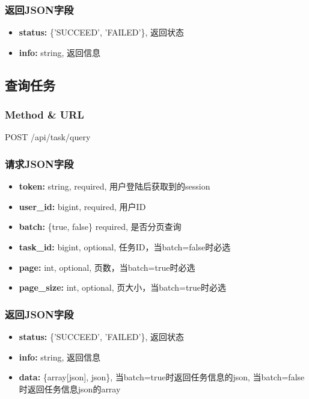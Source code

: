 ﻿\documentclass[a4paper]{report}
\begin{document}
\subsubsection{返回JSON字段}
\begin{itemize}
	\item \textbf{status:} \{'SUCCEED', 'FAILED'\}, 返回状态
	\item \textbf{info:} string, 返回信息
\end{itemize}



\subsection{查询任务} %
\subsubsection{Method \& URL} %
POST /api/task/query

\subsubsection{请求JSON字段}
\begin{itemize}
	\item \textbf{token:} string, required, 用户登陆后获取到的session
	\item \textbf{user\_id:} bigint, required, 用户ID
	\item \textbf{batch:} \{true, false\} required, 是否分页查询
	\item \textbf{task\_id:} bigint, optional, 任务ID，当batch=false时必选
	\item \textbf{page:} int, optional, 页数，当batch=true时必选
	\item \textbf{page\_size:} int, optional, 页大小，当batch=true时必选
\end{itemize}

\subsubsection{返回JSON字段}
\begin{itemize}
	\item \textbf{status:} \{'SUCCEED', 'FAILED'\}, 返回状态
	\item \textbf{info:} string, 返回信息
	\item \textbf{data:} \{array[json], json\}, 当batch=true时返回任务信息的json, 当batch=false时返回任务信息json的array
\end{itemize}
\end{document}
